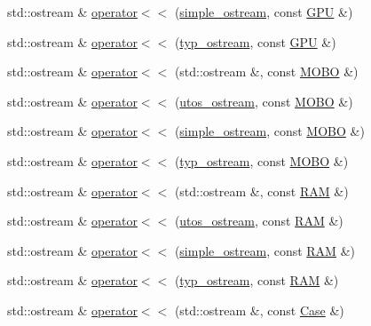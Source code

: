 \begin{DoxyCompactItemize}
\item 
std\+::ostream \& \mbox{\hyperlink{_parts_8h_aeb310e3ac097a648eacf8c7c1c73459c}{operator$<$$<$}} (\mbox{\hyperlink{structsimple__ostream}{simple\+\_\+ostream}}, const \mbox{\hyperlink{class_g_p_u}{G\+PU}} \&)
\item 
std\+::ostream \& \mbox{\hyperlink{_parts_8h_ae2a5124b8c44cb362535a24809a8cdc9}{operator$<$$<$}} (\mbox{\hyperlink{structtyp__ostream}{typ\+\_\+ostream}}, const \mbox{\hyperlink{class_g_p_u}{G\+PU}} \&)
\item 
std\+::ostream \& \mbox{\hyperlink{_parts_8h_a3b7a2a4db5c057c863872d61e15867ca}{operator$<$$<$}} (std\+::ostream \&, const \mbox{\hyperlink{class_m_o_b_o}{M\+O\+BO}} \&)
\item 
std\+::ostream \& \mbox{\hyperlink{_parts_8h_ac2eced95444aa93aa7aa2e748a3809e2}{operator$<$$<$}} (\mbox{\hyperlink{structutos__ostream}{utos\+\_\+ostream}}, const \mbox{\hyperlink{class_m_o_b_o}{M\+O\+BO}} \&)
\item 
std\+::ostream \& \mbox{\hyperlink{_parts_8h_ac41981ae19ad846f7acaaa3e35e9020f}{operator$<$$<$}} (\mbox{\hyperlink{structsimple__ostream}{simple\+\_\+ostream}}, const \mbox{\hyperlink{class_m_o_b_o}{M\+O\+BO}} \&)
\item 
std\+::ostream \& \mbox{\hyperlink{_parts_8h_aa44f686b648c0bd9497d73bdea9baca0}{operator$<$$<$}} (\mbox{\hyperlink{structtyp__ostream}{typ\+\_\+ostream}}, const \mbox{\hyperlink{class_m_o_b_o}{M\+O\+BO}} \&)
\item 
std\+::ostream \& \mbox{\hyperlink{_parts_8h_a119a3c9e22eaeee7ac8e0e0400429fe2}{operator$<$$<$}} (std\+::ostream \&, const \mbox{\hyperlink{class_r_a_m}{R\+AM}} \&)
\item 
std\+::ostream \& \mbox{\hyperlink{_parts_8h_a098f804bf78d9b26a127d31657434067}{operator$<$$<$}} (\mbox{\hyperlink{structutos__ostream}{utos\+\_\+ostream}}, const \mbox{\hyperlink{class_r_a_m}{R\+AM}} \&)
\item 
std\+::ostream \& \mbox{\hyperlink{_parts_8h_a46f556565a980b90c0bf423a485ff953}{operator$<$$<$}} (\mbox{\hyperlink{structsimple__ostream}{simple\+\_\+ostream}}, const \mbox{\hyperlink{class_r_a_m}{R\+AM}} \&)
\item 
std\+::ostream \& \mbox{\hyperlink{_parts_8h_a99a79ed89b48be1877b700cb45549c72}{operator$<$$<$}} (\mbox{\hyperlink{structtyp__ostream}{typ\+\_\+ostream}}, const \mbox{\hyperlink{class_r_a_m}{R\+AM}} \&)
\item 
std\+::ostream \& \mbox{\hyperlink{_parts_8h_a095fc6bc853799360bba8d744652202a}{operator$<$$<$}} (std\+::ostream \&, const \mbox{\hyperlink{class_case}{Case}} \&)

\end{DoxyCompactItemize}
